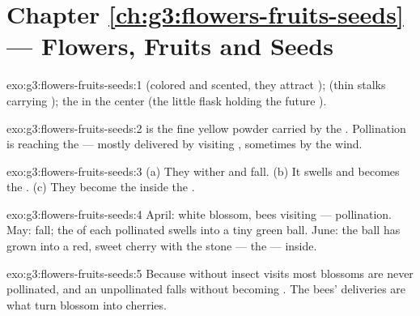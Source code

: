 \section*{Chapter \ref{ch:g3:flowers-fruits-seeds} --- Flowers, Fruits and Seeds}

\begin{solution}{exo:g3:flowers-fruits-seeds:1}
 (colored and scented, they attract ); 
(thin stalks carrying ); the  in the center (the
little flask holding the future ).
\end{solution}

\begin{solution}{exo:g3:flowers-fruits-seeds:2}
 is the fine yellow powder carried by the .
Pollination is  reaching the  --- mostly delivered
by visiting , sometimes by the wind.
\end{solution}

\begin{solution}{exo:g3:flowers-fruits-seeds:3}
(a) They wither and fall. (b) It swells and becomes the .
(c) They become the  inside the .
\end{solution}

\begin{solution}{exo:g3:flowers-fruits-seeds:4}
April: white blossom, bees visiting --- pollination. May: 
fall; the  of each pollinated  swells into a tiny
green ball. June: the ball has grown into a red, sweet cherry
with the stone --- the  --- inside.
\end{solution}

\begin{solution}{exo:g3:flowers-fruits-seeds:5}
Because without insect visits most blossoms are never
pollinated, and an unpollinated  falls without becoming
. The bees'  deliveries are what turn blossom into
cherries.
\end{solution}

